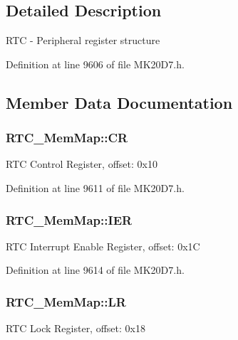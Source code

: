 \subsection{Detailed Description}
R\+TC -\/ Peripheral register structure 

Definition at line 9606 of file M\+K20\+D7.\+h.



\subsection{Member Data Documentation}
\subsubsection[{\texorpdfstring{CR}{CR}}]{ R\+T\+C\+\_\+\+Mem\+Map\+::\+CR}\hypertarget{struct_r_t_c___mem_map_a05c71be888cd40a4d91c631260d684d7}{}\label{struct_r_t_c___mem_map_a05c71be888cd40a4d91c631260d684d7}
R\+TC Control Register, offset\+: 0x10 

Definition at line 9611 of file M\+K20\+D7.\+h.

\subsubsection[{\texorpdfstring{I\+ER}{IER}}]{ R\+T\+C\+\_\+\+Mem\+Map\+::\+I\+ER}\hypertarget{struct_r_t_c___mem_map_a1db69b589f5bfc5faa12b9c54e7c8061}{}\label{struct_r_t_c___mem_map_a1db69b589f5bfc5faa12b9c54e7c8061}
R\+TC Interrupt Enable Register, offset\+: 0x1C 

Definition at line 9614 of file M\+K20\+D7.\+h.

\subsubsection[{\texorpdfstring{LR}{LR}}]{ R\+T\+C\+\_\+\+Mem\+Map\+::\+LR}\hypertarget{struct_r_t_c___mem_map_a6d1b4fe68ed53926b57392e7ad582469}{}\label{struct_r_t_c___mem_map_a6d1b4fe68ed53926b57392e7ad582469}
R\+TC Lock Register, offset\+: 0x18 

